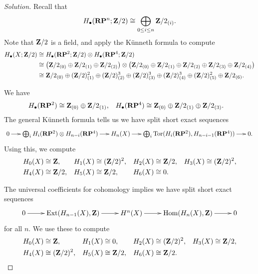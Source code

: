 \begin{proof}[Solution]
  Recall that
  \[
  H_\bullet(\mathbf{R}\mathbf{P}^n;\mathbf{Z}/2) \cong \bigoplus_{0 \leq i \leq n} \mathbf{Z}/2_{(i)}.
  \]
  Note that $\mathbf{Z}/2$ is a field, and apply the K\"unneth formula to compute
  \begin{align*}
    H_\bullet(X;\mathbf{Z}/2)
    &\cong
    H_\bullet(\mathbf{R}\mathbf{P}^2;\mathbf{Z}/2) \otimes H_\bullet(\mathbf{R}\mathbf{P}^4;\mathbf{Z}/2) \\
    &\cong
    \left( \mathbf{Z}/2_{(0)} \oplus \mathbf{Z}/2_{(1)} \oplus \mathbf{Z}/2_{(2)} \right) \otimes \left( \mathbf{Z}/2_{(0)} \oplus \mathbf{Z}/2_{(1)} \oplus \mathbf{Z}/2_{(2)} \oplus \mathbf{Z}/2_{(3)} \oplus \mathbf{Z}/2_{(4)} \right) \\
    &\cong
    \mathbf{Z}/2_{(0)} \oplus (\mathbf{Z}/2)_{(1)}^2 \oplus (\mathbf{Z}/2)_{(2)}^3 \oplus (\mathbf{Z}/2)_{(3)}^3 \oplus (\mathbf{Z}/2)_{(4)}^3 \oplus (\mathbf{Z}/2)_{(5)}^2 \oplus \mathbf{Z}/2_{(6)}.
  \end{align*}
  
  We have
  \begin{align*}
    H_\bullet(\mathbf{R}\mathbf{P}^2) &\cong \mathbf{Z}_{(0)} \oplus \mathbf{Z}/2_{(1)}, &
    H_\bullet(\mathbf{R}\mathbf{P}^4) &\cong \mathbf{Z}_{(0)} \oplus \mathbf{Z}/2_{(1)} \oplus \mathbf{Z}/2_{(3)}.
  \end{align*}
  The general K\"unneth formula tells us we have split short exact sequences
  \[\xymatrix@C=0.2in{
    0 \ar[r] & \bigoplus_i H_i(\R\P^2) \otimes H_{n-i}(\R\P^4) \ar[r] & H_n(X) \ar[r] & \bigoplus_i \Tor(H_i(\R\P^2),H_{n-i-1}(\R\P^4)) \ar[r] & 0.
  }\]
  Using this, we compute
  \begin{align*}
    H_0(X) &\cong \mathbf{Z}, &
    H_1(X) &\cong (\mathbf{Z}/2)^2, &
    H_2(X) &\cong \mathbf{Z}/2, &
    H_3(X) &\cong (\mathbf{Z}/2)^2, \\
    H_4(X) &\cong \mathbf{Z}/2, &
    H_5(X) &\cong \mathbf{Z}/2, &
    H_6(X) &\cong 0.
  \end{align*}
  
  The universal coefficients for cohomology implies we have split short exact sequences
  \[\xymatrix{
    0 \ar[r] & \Ext(H_{n-1}(X),\Z) \ar[r] & H^n(X) \ar[r] & \Hom(H_n(X),\Z) \ar[r] & 0
  }\]
  for all $n$. We use these to compute
  \begin{align*}
    H_0(X) &\cong \mathbf{Z}, &
    H_1(X) &\cong 0, &
    H_2(X) &\cong (\mathbf{Z}/2)^2, &
    H_3(X) &\cong \mathbf{Z}/2, \\
    H_4(X) &\cong (\mathbf{Z}/2)^2, &
    H_5(X) &\cong \mathbf{Z}/2, &
    H_6(X) &\cong \mathbf{Z}/2. && \qedhere
  \end{align*}
\end{proof}


